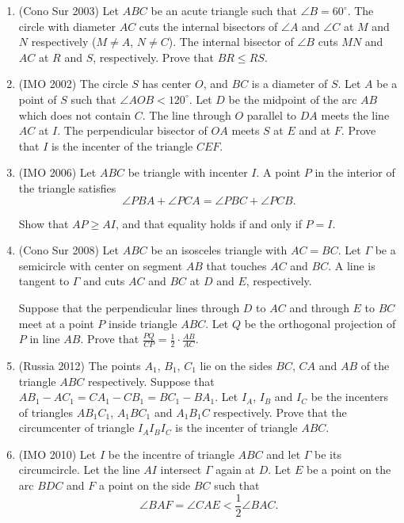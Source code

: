 \documentclass[10pt]{article}
\theoremstyle{definition}
\theoremstyle{remark}
\begin{document}
\begin{enumerate}
\item (Cono Sur 2003) Let $ABC$ be an acute triangle such that $\angle B = 60^\circ$. The circle with diameter $AC$ cuts the internal bisectors of $\angle A$ and $\angle C$ at $M$ and $N$ respectively ($M\neq A$, $N \neq C$). The internal bisector of $\angle B$ cuts $MN$ and $AC$ at $R$ and $S$, respectively. Prove that $BR \leq RS$.

\item (IMO 2002) The circle $S$ has center $O$, and $BC$ is a diameter of $S$. Let $A$ be a point of $S$ such that $\angle AOB<120^\circ$. Let $D$ be the midpoint of the arc $AB$ which does not contain $C$. The line through $O$ parallel to $DA$ meets the line $AC$ at $I$. The perpendicular bisector of $OA$ meets $S$ at $E$ and at $F$. Prove that $I$ is the incenter of the triangle $CEF$.

\item (IMO 2006) Let $ABC$ be triangle with incenter $I$. A point $P$ in the interior of the triangle satisfies
$$\angle PBA+\angle PCA = \angle PBC+\angle PCB.$$

Show that $AP \geq AI$, and that equality holds if and only if $P=I$.

\item (Cono Sur 2008) Let $ABC$ be an isosceles triangle with $AC = BC$. Let $\Gamma$ be a semicircle with center on segment $AB$ that touches $AC$ and $BC$. A line is tangent to $\Gamma$ and cuts $AC$ and $BC$ at $D$ and $E$, respectively.

Suppose that the perpendicular lines through $D$ to $AC$ and through $E$ to $BC$ meet at a point $P$ inside triangle $ABC$. Let $Q$ be the orthogonal projection of $P$ in line $AB$. Prove that $\frac{PQ}{CP} = \frac12\cdot\frac{AB}{AC}$.

\item (Russia 2012) The points $A_1$, $B_1$, $C_1$ lie on the sides $BC$, $CA$ and $AB$ of the triangle $ABC$ respectively. Suppose that $AB_1 - AC_1 = CA_1 - CB_1 = BC_1 - BA_1$. Let $I_A$, $I_B$ and $I_C$ be the incenters of triangles $AB_1C_1$, $A_1BC_1$ and $A_1B_1C$ respectively. Prove that the circumcenter of triangle $I_AI_BI_C$ is the incenter of triangle $ABC$.

\item (IMO 2010) Let $I$ be the incentre of triangle $ABC$ and let $\Gamma$ be its circumcircle. Let the line $AI$ intersect $\Gamma$ again at $D$. Let $E$ be a point on the arc $BDC$ and $F$ a point on the side $BC$ such that
$$\angle BAF = \angle CAE < \frac12\angle BAC.$$


\end{enumerate}
\end{document}
